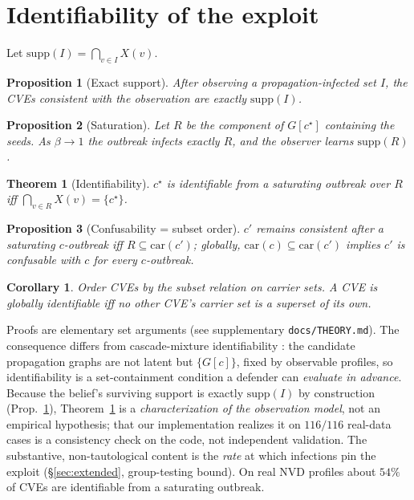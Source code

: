 \documentclass[11pt]{article}
\newtheorem{theorem}{Theorem}
\newtheorem{proposition}{Proposition}
\newtheorem{corollary}{Corollary}
\newcommand{\carriers}{\mathrm{car}}
\newcommand{\supp}{\mathrm{supp}}
\begin{document}
\section{Identifiability of the exploit}\label{sec:theory}
Let $\supp(I)=\bigcap_{v\in I}X(v)$.

\begin{proposition}[Exact support]\label{prop:supp}
After observing a propagation-infected set $I$, the CVEs consistent with the
observation are exactly $\supp(I)$.
\end{proposition}

\begin{proposition}[Saturation]\label{prop:sat}
Let $R$ be the component of $G[c^\star]$ containing the seeds. As $\beta\to1$ the
outbreak infects exactly $R$, and the observer learns $\supp(R)$.
\end{proposition}

\begin{theorem}[Identifiability]\label{thm:id}
$c^\star$ is identifiable from a saturating outbreak over $R$ iff
$\bigcap_{v\in R}X(v)=\{c^\star\}$.
\end{theorem}

\begin{proposition}[Confusability = subset order]\label{prop:conf}
$c'$ remains consistent after a saturating $c$-outbreak iff $R\subseteq
\carriers(c')$; globally, $\carriers(c)\subseteq\carriers(c')$ implies $c'$ is
confusable with $c$ for every $c$-outbreak.
\end{proposition}

\begin{corollary}
Order CVEs by the subset relation on carrier sets. A CVE is globally identifiable
iff no other CVE's carrier set is a superset of its own.
\end{corollary}

Proofs are elementary set arguments (see supplementary \texttt{docs/THEORY.md}).
The consequence differs from cascade-mixture identifiability
\citep{hoffmann2020mixtures}: the candidate propagation graphs are not latent but
$\{G[c]\}$, fixed by observable profiles, so identifiability is a set-containment
condition a defender can \emph{evaluate in advance}. Because the belief's
surviving support is exactly $\supp(I)$ by construction (Prop.~\ref{prop:supp}),
Theorem~\ref{thm:id} is a \emph{characterization of the observation model}, not an
empirical hypothesis; that our implementation realizes it on $116/116$ real-data
cases is a consistency check on the code, not independent validation. The
substantive, non-tautological content is the \emph{rate} at which infections pin
the exploit (\S\ref{sec:extended}, group-testing bound). On real NVD profiles
about $54\%$ of CVEs are identifiable from a saturating outbreak.
\end{document}
